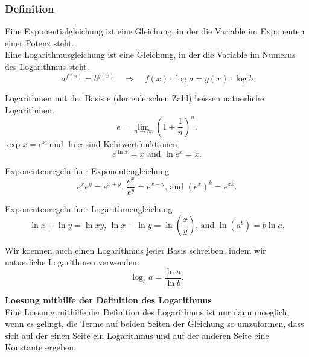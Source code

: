 \begin{multicols}{2}
    \subsubsection{Definition}
    \vspace{-4mm}
    Eine Exponentialgleichung ist eine Gleichung, in der die Variable im Exponenten einer Potenz steht. \\
    Eine Logarithmusgleichung ist eine Gleichung, in der die Variable im Numerus des Logarithmus steht.
    \[a^{f(x)} = b^{g(x)} \quad \Rightarrow \quad f(x) \cdot \log a = g(x) \cdot \log b\]

    Logarithmen mit der Basis e (der eulerschen Zahl) heissen natuerliche Logarithmen.
    \begin{equation*}
        e = \lim\limits_{n\rightarrow\infty}{\left(1+\frac{1}{n}\right)^n}.
    \end{equation*}
    \noindent
    $\exp{x} = e^x$ und $\ln{x}$ sind Kehrwertfunktionen
    \begin{equation*}
        e^{\ln{x}} = x \text{ and } \ln{e^x} = x.
    \end{equation*}

    \noindent
    Exponentenregeln fuer Exponentengleichung
    \begin{equation*}
        e^xe^y = e^{x+y} \text{, } \frac{e^x}{e^y}=e^{x-y} \text{, and } \left(e^x\right)^k=e^{xk}.
    \end{equation*}

    \noindent
    Exponentenregeln fuer Logarithmengleichung
    \begin{equation*}
        \ln{x}+\ln{y} = \ln{xy} \text{, } \ln{x}-\ln{y} = \ln{\left(\frac{x}{y}\right)} \text{, and } \ln{\left(a^b\right)} = b\ln{a}.
    \end{equation*}

    \noindent
    Wir koennen auch einen Logarithmus jeder Basis schreiben, indem wir natuerliche Logarithmen verwenden:
    \begin{equation*}
        \log_{b}{a} = \frac{\ln{a}}{\ln{b}}.
    \end{equation*}

    \textbf{Loesung mithilfe der Definition des Logarithmus}\\
    Eine Loesung mithilfe der Definition des Logarithmus ist nur dann moeglich, wenn es gelingt, die Terme auf beiden Seiten der Gleichung so umzuformen, dass sich auf der einen Seite ein Logarithmus und auf der anderen Seite eine Konstante ergeben.


\end{multicols}
